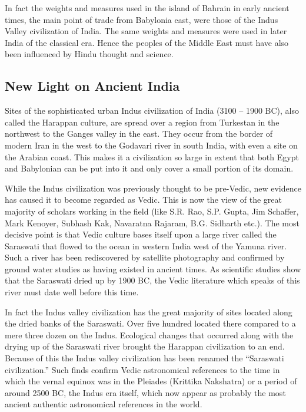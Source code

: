  

In fact the weights and measures used in the island of Bahrain in early ancient times, the main point of trade from Babylonia east, were those of the Indus Valley civilization of India. The same weights and measures were used in later India of the classical era. Hence the peoples of the Middle East must have also been influenced by Hindu thought and science.

 

\subsection{New Light on Ancient India}
 

Sites of the sophisticated urban Indus civilization of India (3100 – 1900 BC), also called the Harappan culture, are spread over a region from Turkestan in the northwest to the Ganges valley in the east. They occur from the border of modern Iran in the west to the Godavari river in south India, with even a site on the Arabian coast. This makes it a civilization so large in extent that both Egypt and Babylonian can be put into it and only cover a small portion of its domain.

 

While the Indus civilization was previously thought to be pre-Vedic, new evidence has caused it to become regarded as Vedic. This is now the view of the great majority of scholars working in the field (like S.R. Rao, S.P. Gupta, Jim Schaffer, Mark Kenoyer, Subhash Kak, Navaratna Rajaram, B.G. Sidharth etc.). The most decisive point is that Vedic culture bases itself upon a large river called the Saraswati that flowed to the ocean in western India west of the Yamuna river. Such a river has been rediscovered by satellite photography and confirmed by ground water studies as having existed in ancient times. As scientific studies show that the Saraswati dried up by 1900 BC, the Vedic literature which speaks of this river must date well before this time.

 

In fact the Indus valley civilization has the great majority of sites located along the dried banks of the Saraswati. Over five hundred located there compared to a mere three dozen on the Indus. Ecological changes that occurred along with the drying up of the Saraswati river brought the Harappan civilization to an end. Because of this the Indus valley civilization has been renamed the “Saraswati civilization.” Such finds confirm Vedic astronomical references to the time in which the vernal equinox was in the Pleiades (Krittika Nakshatra) or a period of around 2500 BC, the Indus era itself, which now appear as probably the most ancient authentic astronomical references in the world.

